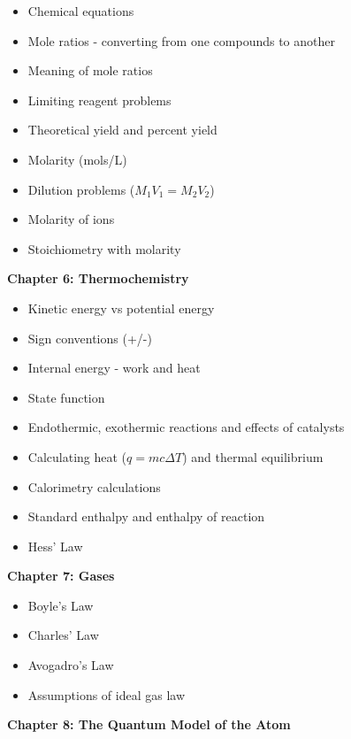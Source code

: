 \documentclass[12pt]{article}
\begin{document}
\begin{itemize}
  \setlength\itemsep{0em}
\item Chemical equations
\item Mole ratios - converting from one compounds to another
\item Meaning of mole ratios
\item Limiting reagent problems
\item Theoretical yield and percent yield
\item Molarity (mols/L)
\item Dilution problems ($M_1V_1 = M_2V_2$)
\item Molarity of ions
\item Stoichiometry with molarity
\end{itemize}

\textbf{Chapter 6: Thermochemistry}

\begin{itemize}
  \setlength\itemsep{0em}
\item Kinetic energy vs potential energy
\item Sign conventions (+/-)
\item Internal energy - work and heat
\item State function
\item Endothermic, exothermic reactions and effects of catalysts
\item Calculating heat ($q=mc\Delta T$) and thermal equilibrium
\item Calorimetry calculations
\item Standard enthalpy and enthalpy of reaction
  \item Hess' Law
\end{itemize}

\textbf{Chapter 7: Gases}

\begin{itemize}
  \setlength\itemsep{0em}
\item Boyle's Law
\item Charles' Law
\item Avogadro's Law
\item Assumptions of ideal gas law
\end{itemize}

\textbf{Chapter 8: The Quantum Model of the Atom}
\end{document}
